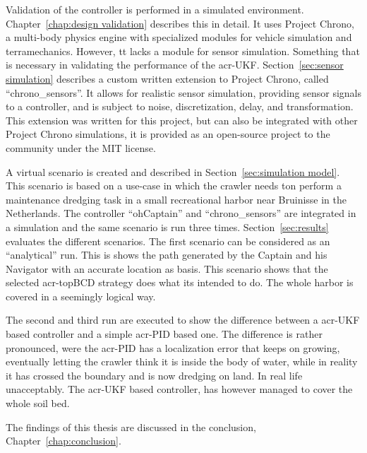 Validation of the controller is performed in a simulated environment. Chapter~\ref{chap:design validation} describes 
this in detail. It uses Project Chrono, a multi-body physics engine with specialized modules for vehicle simulation 
and terramechanics. However, tt lacks a module for sensor simulation. Something that is necessary in validating the 
performance of the \gls{acr-UKF}. Section~\ref{sec:sensor simulation} describes a custom written extension to Project
Chrono, called ``chrono\_sensors''. It allows for realistic sensor simulation, providing sensor signals to a 
controller, and is subject to noise, discretization, delay, and transformation. This extension was written for this 
project, but can also be integrated with other Project Chrono simulations, it is provided as an open-source project 
to the community under the MIT license.

A virtual scenario is created and described in Section~\ref{sec:simulation model}. This scenario is based on a 
use-case in which the crawler needs ton perform a maintenance dredging task in a small recreational harbor near 
Bruinisse in the Netherlands. The controller ``ohCaptain'' and ``chrono\_sensors'' are integrated in a simulation and
the same scenario is run three times. Section~\ref{sec:results} evaluates the different scenarios. The first scenario
can be considered as an ``analytical'' run. This is shows the path generated by the Captain and his Navigator with an
accurate location as basis. This scenario shows that the selected \gls{acr-topBCD} strategy does what its intended to
do. The whole harbor is covered in a seemingly logical way.

The second and third run are executed to show the difference between a \gls{acr-UKF} based controller and a simple
\gls{acr-PID} based one. The difference is rather pronounced, were the \gls{acr-PID} has a localization error that
keeps on growing, eventually letting the crawler think it is inside the body of water, while in reality it has
crossed the boundary and is now dredging on land. In real life unacceptably. The \gls{acr-UKF} based controller, has 
however managed to cover the whole soil bed.

\noindent The findings of this thesis are discussed in the conclusion, Chapter~\ref{chap:conclusion}.

